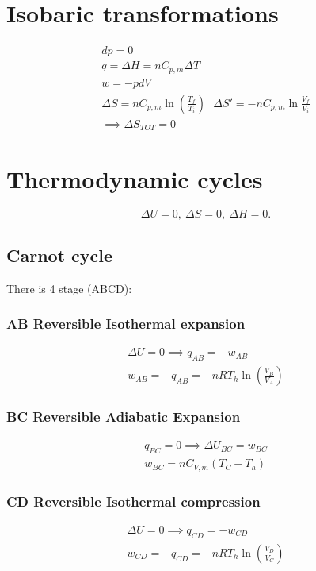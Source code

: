 \documentclass[Master.tex]{subfiles}
\begin{document}
\begin{multicols}{2}
		 \section{Isobaric transformations}

		  \begin{gather*}
				   dp = 0  \\
				   q = \Delta H = nC_{p,m}\Delta T\\
				   w = -pdV\\
				   \Delta S = n C_{p,m} \ln (\frac{T_f}{T_i}) ~ ~ ~ \Delta S' = -nC_{p,m} \ln \frac{V_{f} }{V_{i}}\\
				   \implies \Delta S_{TOT} = 0
		  \end{gather*}

		 \section{Thermodynamic cycles}
		  \[
				   \Delta U = 0, ~ \Delta S = 0, ~ \Delta H = 0
				   .\]

		  \subsection{Carnot cycle}
				   There is 4 stage (ABCD):
				   \subsubsection{AB Reversible Isothermal expansion}
						    \begin{gather*}
								     \Delta U = 0 \implies q_{AB} = -w_{AB}\\
								     w_{AB} = -q_{AB} = -nRT_{h}\ln \left(\frac{V_{B}}{V_{A}} \right)
						    \end{gather*}

				   \subsubsection{BC Reversible Adiabatic Expansion}
						    \begin{gather*}
								     q_{BC} = 0 \implies \Delta U_{BC} = w_{BC}\\
								     w_{BC} = nC_{V,m}(T_{C}-T_{h})
						    \end{gather*}

				   \subsubsection{CD Reversible Isothermal compression}
						    \begin{gather*}
								     \Delta U = 0 \implies q_{CD} = -w_{CD}\\
								     w_{CD} = -q_{CD} = -nRT_{h}\ln \left (\frac{V_{D}}{V_{C}} \right )
						    \end{gather*}


\end{multicols}
\end{document}
